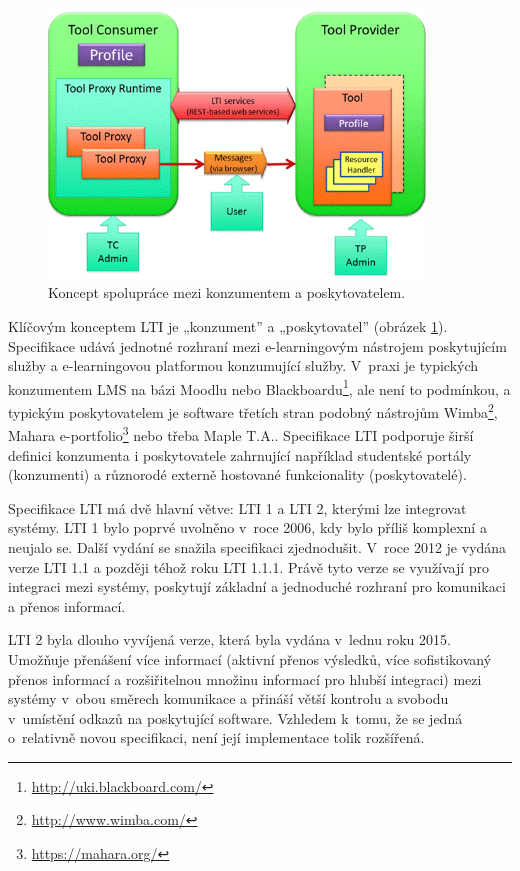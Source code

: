 \documentclass[
print,
  11pt,
  table,   
  nolof,    
  nolot,
  oneside,final
]{fithesis3}
\begin{document}
\begin{figure}[htb]
		  \begin{center}
		    \includegraphics[width=100mm]{images/ltipic.png}
		   \end{center}
		  \caption{Koncept spolupráce mezi konzumentem a poskytovatelem. \cite{imslti20}}
		  \label{fig:ltipic}
		\end{figure}
Klíčovým konceptem LTI je „konzument” a „poskytovatel” (obrázek \ref{fig:ltipic}). Specifikace udává jednotné rozhraní mezi e-learningovým nástrojem poskytujícím služ\-by a e-learningovou platformou konzumující služby. V~praxi je typických konzumentem LMS na bázi Moodlu nebo Blackboardu\footnote{\url{http://uki.blackboard.com/}}, ale není to podmínkou, a typickým poskytovatelem je software třetích stran podobný nástrojům Wimba\footnote{\url{http://www.wimba.com/}}, Mahara e-portfolio\footnote{\url{https://mahara.org/}} nebo třeba Maple T.A.. Specifikace LTI podporuje širší definici konzumenta i poskytovatele zahrnující například studentské portály (konzumenti) a různorodé externě hostované funkcionality (poskytovatelé). \cite{imsltiinvest}


Specifikace LTI má dvě hlavní větve: LTI 1 a LTI 2, kterými lze integrovat systémy. LTI 1 bylo poprvé uvolněno v~roce 2006, kdy bylo příliš komplexní a neujalo se. Další vydání se snažila specifikaci zjednodušit. V~roce 2012 je vydána verze LTI 1.1 a později téhož roku LTI 1.1.1. Právě tyto verze se využívají pro integraci mezi systémy, poskytují základní a jednoduché rozhraní pro komunikaci a přenos informací.

LTI 2 byla dlouho vyvíjená verze, která byla vydána v~lednu roku 2015. Umožňuje přenášení více informací (aktivní přenos výsledků, více sofistikovaný přenos informací a rozšiřitelnou množinu informací pro hlubší integraci) mezi systémy v~obou směrech komunikace a přináší větší kontrolu a svobodu v~umístění odkazů na poskytující software. Vzhledem k~tomu, že se jedná o~relativně novou specifikaci, není její implementace tolik rozšířená. \cite{imslti20}
\end{document}

